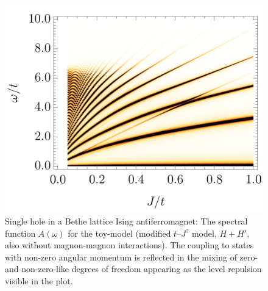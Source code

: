 \documentclass[10pt, a4paper, onecolumn]{article}
\begin{document}
\begin{figure}[t!]
	\includegraphics[width=0.79\columnwidth]
	{./figures/bethe_acr.png}
	\caption{
		Single hole in a Bethe lattice Ising antiferromagnet: The spectral function $A(\omega)$ for the toy-model (modified $t$--$J^z$ model, $H + H'$, also without magnon-magnon interactions). The coupling to states with non-zero angular momentum is reflected in the mixing of zero- and non-zero-like degrees of freedom appearing as the level repulsion visible in the plot.
	}\label{fig:crossing}
\end{figure}
\end{document}
